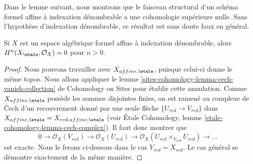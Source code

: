 \noindent
Dans le lemme suivant, nous montrons que le faisceau structural d'un schéma formel
affine à indexation dénombrable a une cohomologie supérieure nulle.
Sans l'hypothèse d'indexation dénombrable, ce résultat est sans doute faux en général.

\begin{lemma}
\label{lemma-higher-vanishing-structure-sheaf}
Si $X$ est un espace algébrique formel affine à indexation dénombrable, alors
$H^n(X_\etale, \mathcal{O}_X) = 0$ pour $n > 0$.
\end{lemma}

\begin{proof}
Nous pouvons travailler avec $X_{affine, \etale}$, puisque celui-ci donne le même topos.
Nous allons appliquer le lemme
\ref{sites-cohomology-lemma-cech-vanish-collection}
de Cohomology on Sites pour établir cette annulation. Comme $X_{affine, \etale}$
possède les sommes disjointes finies, on est ramené au complexe de {\v C}ech
d'un recouvrement donné par une seule flèche $\{U_{red} \to V_{red}\}$
dans $X_{affine, \etale} = X_{red, affine, \etale}$
(voir \'Etale Cohomology, lemme \ref{etale-cohomology-lemma-cech-complex}).
Il faut donc montrer que
$$
0 \to \mathcal{O}_X(V_{red}) \to \mathcal{O}_X(U_{red}) \to
\mathcal{O}_X(U_{red} \times_{V_{red}} U_{red}) \to \ldots
$$
est exacte. Nous le ferons ci-dessous dans le cas $V_{red} = X_{red}$.
Le cas général se démontre exactement de la même manière.


\end{proof}
